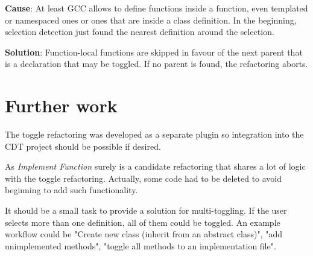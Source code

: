 \textbf{Cause}: At least GCC allows to define functions inside a function, even 
templated or namespaced ones or ones that are inside a class definition. In the 
beginning, selection detection just found the nearest definition around the 
selection.

\textbf{Solution}: Function-local functions are skipped in favour of the next 
parent that is a declaration that may be toggled. If no parent is found, the 
refactoring aborts.


\section{Further work}

The toggle refactoring was developed as a separate plugin so integration into 
the CDT project should be possible if desired.

As \textit{Implement Function} surely is a candidate refactoring that shares a 
lot of logic with the toggle refactoring. Actually, some code had to be deleted 
to avoid beginning to add such functionality.

It should be a small task to provide a solution for multi-toggling. If the user 
selects more than one definition, all of them could be toggled. An example 
workflow could be "Create new class (inherit from an abstract class)", "add 
unimplemented methods", "toggle all methods to an implementation file".


